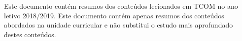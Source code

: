 \documentclass[../resumosTCOM.tex]{subfiles}
\begin{document}
 

Este documento contém resumos dos conteúdos lecionados em TCOM no ano letivo 2018/2019. Este documento contém apenas resumos dos conteúdos abordados na unidade curricular e não substitui o estudo mais aprofundado destes conteúdos.
\end{document}
